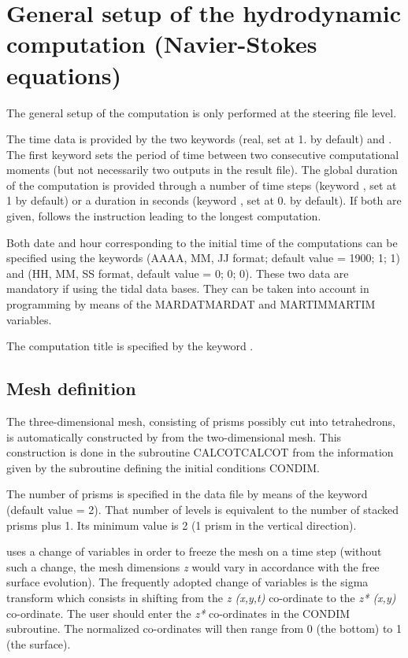 \chapter{General setup of the hydrodynamic computation (Navier-Stokes equations)}

The general setup of the computation is only performed at the steering file
level.

The time data is provided by the two keywords  (real, set at
1. by default) and . The first keyword sets the
period of time between two consecutive computational moments (but not
necessarily two outputs in the result file). The global duration of the
computation is provided through a number of time steps (keyword , set at 1 by default) or a duration in seconds (keyword
, set at 0. by default). If both are given,  follows
the instruction leading to the longest computation.

Both date and hour corresponding to the initial time of the computations can be
specified using the keywords  (AAAA, MM, JJ format; default value = 1900; 1; 1) and  (HH, MM, SS format, default value = 0; 0;
0). These two data are mandatory if using the tidal data bases. They can be
taken into account in programming by means of the MARDATMARDAT and MARTIMMARTIM
variables.

The computation title is specified by the keyword .


\section{Mesh definition}

The three-dimensional mesh, consisting of prisms possibly cut into
tetrahedrons, is automatically constructed by  from the
two-dimensional mesh. This construction is done in the subroutine CALCOTCALCOT
from the information given by the subroutine defining the initial conditions
CONDIM.

The number of prisms is specified in the data file by means of the keyword
 (default value = 2). That number of levels
is equivalent to the number of stacked prisms plus 1. Its minimum value is 2 (1
prism in the vertical direction).

 uses a change of variables in order to freeze the mesh on a time
step (without such a change, the mesh dimensions \textit{z} would vary in
accordance with the free surface evolution). The frequently adopted change of
variables is the sigma transform which consists in shifting from the \textit{z
(x,y,t)} co-ordinate to the \textit{z* (x,y)} co-ordinate. The user should
enter the \textit{z*} co-ordinates in the CONDIM subroutine. The
normalized co-ordinates will then range from 0 (the bottom) to 1 (the surface).

